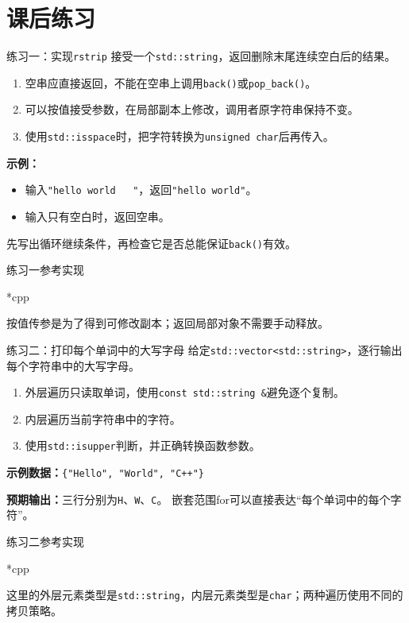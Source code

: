 \section{课后练习}

\begin{frame}{练习一：实现\texttt{rstrip}}
接受一个\texttt{std::string}，返回删除末尾连续空白后的结果。
\begin{enumerate}
\item 空串应直接返回，不能在空串上调用\texttt{back()}或\texttt{pop\_back()}。
\item 可以按值接受参数，在局部副本上修改，调用者原字符串保持不变。
\item 使用\texttt{std::isspace}时，把字符转换为\texttt{unsigned char}后再传入。
\end{enumerate}
\medskip
\textbf{示例：}
\begin{itemize}
\item 输入\texttt{"hello world\ \ \ "}，返回\texttt{"hello world"}。
\item 输入只有空白时，返回空串。
\end{itemize}
\alert{先写出循环继续条件，再检查它是否总能保证\texttt{back()}有效。}
\end{frame}

\begin{frame}{练习一参考实现}
\begin{Code}*{cpp}\end{Code}
\small 按值传参是为了得到可修改副本；返回局部对象不需要手动释放。
\end{frame}

\begin{frame}{练习二：打印每个单词中的大写字母}
给定\texttt{std::vector<std::string>}，逐行输出每个字符串中的大写字母。
\begin{enumerate}
\item 外层遍历只读取单词，使用\texttt{const std::string \&}避免逐个复制。
\item 内层遍历当前字符串中的字符。
\item 使用\texttt{std::isupper}判断，并正确转换函数参数。
\end{enumerate}
\medskip
\textbf{示例数据：}\texttt{\{"Hello", "World", "C++"\}}

\textbf{预期输出：}三行分别为\texttt{H}、\texttt{W}、\texttt{C}。
\medskip
\alert{嵌套范围for可以直接表达“每个单词中的每个字符”。}
\end{frame}

\begin{frame}{练习二参考实现}
\begin{Code}*{cpp}\end{Code}
\small 这里的外层元素类型是\texttt{std::string}，内层元素类型是\texttt{char}；两种遍历使用不同的拷贝策略。
\end{frame}


